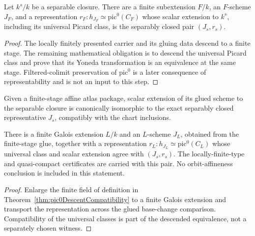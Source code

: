 \begin{theorem}
  \label{thm:pic0DescentCompatibility}
  \notready
  Let \(k^s/k\) be a separable closure.  There are a finite subextension \(F/k\), an
  \(F\)-scheme \(J_F\), and a representation
  \(r_F:h_{J_F}\simeq\mathrm{pic}^0(C_F)\) whose scalar extension to \(k^s\), including its
  universal Picard class, is the separably closed pair \((J_s,r_s)\).
\end{theorem}
\begin{proof}
  The locally finitely presented carrier and its gluing data descend to a finite stage.  The
  remaining mathematical obligation is to descend the universal Picard class and prove that
  its Yoneda transformation is an equivalence at the same stage.  Filtered-colimit
  preservation of \(\mathrm{pic}^0\) is a later consequence of representability and is not an
  input to this step.
\end{proof}

\begin{definition}
  \label{def:pic0FiniteStageBaseChangeIso}
  Given a finite-stage affine atlas package, scalar extension of its glued scheme to the
  separable closure is canonically isomorphic to the exact separably closed representative
  \(J_s\), compatibly with the chart inclusions.
\end{definition}

\begin{theorem}
  \label{thm:pic0FiniteGaloisStage}
  \notready
  There is a finite Galois extension \(L/k\) and an \(L\)-scheme \(J_L\), obtained from the
  finite-stage glue, together with a representation
  \(r_L:h_{J_L}\simeq\mathrm{pic}^0(C_L)\) whose universal class and scalar extension agree
  with \((J_s,r_s)\).  The locally-finite-type and quasi-compact certificates are carried with
  this pair.  No orbit-affineness conclusion is included in this statement.
\end{theorem}
\begin{proof}
  Enlarge the finite field of definition in
  Theorem~\ref{thm:pic0DescentCompatibility} to a finite Galois extension and transport the
  representation across the glued base-change comparison.  Compatibility of the universal
  classes is part of the descended equivalence, not a separately chosen witness.
\end{proof}

